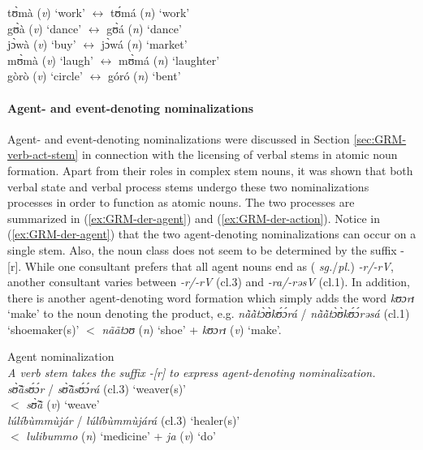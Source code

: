 \begin{exe}
\begin{exe}
\begin{exe}
{\begin{exe}
\begin{exe}
\begin{exe}
\begin{exe}
\begin{exe}
 \ex\label{exːGRM-der-cat-switch}
tʊ̀mà  ({\it v}) `work'  $\leftrightarrow$ tʊ́má ({\it n}) `work'\\
gʊ̀à ({\it v})  `dance' $\leftrightarrow$ gʊ̀á ({\it n}) `dance'\\
jɔ̀wà ({\it v}) `buy'   $\leftrightarrow$ jɔ̀wá  ({\it n})  `market'\\
mʊ̀mà ({\it v}) `laugh'  $\leftrightarrow$ mʊ̀má ({\it n})  `laughter'\\
gòrò ({\it v}) `circle'  $\leftrightarrow$ góró ({\it n})  `bent'
\z


\paragraph{Agent- and event-denoting nominalizations}
\label{sec:GRM-der-agent}

Agent- and event-denoting nominalizations were discussed in
Section \ref{sec:GRM-verb-act-stem} in connection with the licensing of verbal
stems in atomic noun formation. Apart from their roles in complex stem nouns, it
was shown that both verbal state and verbal process stems undergo these two
nominalizations processes in order to function as atomic nouns.
The two
processes are summarized in (\ref{exːGRM-der-agent}) and 
(\ref{exːGRM-der-action}). Notice in (\ref{exːGRM-der-agent}) that the two
agent-denoting nominalizations can occur on a single stem. Also, the
noun class does not seem to be  determined by the suffix
-[r].  While one consultant prefers that all agent nouns end as ({\it
sg.}/{\it pl.}) {\it -r/-rV}, another consultant varies between {\it -r/-rV} 
({\sc cl.3}) and  {\it -ra/-rəsV} ({\sc cl.1}).  In addition, there is another
agent-denoting word formation which simply adds the word {\it kʊɔrɪ} `make' to
the noun denoting the product, e.g. {\it nã̀ã̀tɔ̀ʊ̀kʊ́ɔ́rá} / {\it 
nã̀ã̀tɔ̀ʊ̀kʊ́ɔ́rəsá} ({\sc cl.1}) `shoemaker(s)' $<$ {\it nããtɔʊ} ({\it n})
`shoe' + {\it kʊɔrɪ} ({\it v}) `make'.


\ea\label{exːGRM-der-agent}{\rm Agent nominalization}\\

\ea\label{exːGRM-der-agent-suffix}
{\it A verb stem takes the suffix -[r]  to express agent-denoting
nominalization.} \\
{\it  sʊ̃̀ã̀sʊ́ɔ́r} / {\it sʊ̃̀ã̀sʊ́ɔ́rá} ({\sc cl.3}) `weaver(s)' \\
 $<$  {\it sʊ̃̀ã̀} ({\it v}) `weave'\\
{\it  lúlíbùmmùjár} / {\it lúlíbùmmùjárá} ({\sc cl.3})  `healer(s)' 
\\
$<$ {\it lulibummo} ({\it n}) `medicine' + {\it ja} ({\it v}) `do'



\end{exe}
\end{exe}
\end{exe}
\end{exe}
\end{exe}}
\end{exe}
\end{exe}
\end{exe}
